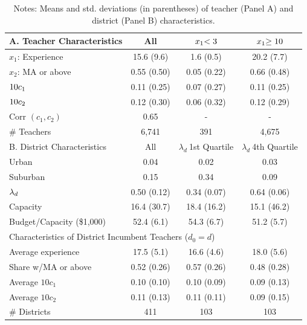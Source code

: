 \documentclass[notitlepage,12pt]{article}%
\begin{document}
\begin{table}[bh]
\caption{Teacher and District Characteristics (2010)}
\begin{center}%
\begin{tabular}
[c]{lccc}\hline\hline
{\small A. Teacher Characteristics} & {\small All} & ${\small x}%
_{1}{\small <3}$ & ${\small x}_{1}{\small \geq10}$\\\hline
$x_{1}$: {\small Experience} & {\small 15.6 (9.6)} & {\small 1.6 (0.5)} &
{\small 20.2 (7.7)}\\
$x_{2}$: {\small MA or above} & {\small 0.55 (0.50)} & {\small 0.05 (0.22)} &
{\small 0.66 (0.48)}\\
${\small 10c}_{1}$ & {\small 0.11 (0.25)} & {\small 0.07 (0.27)} &
{\small 0.11 (0.25)}\\
${\small 10c}_{2}$ & {\small 0.12 (0.30)} & {\small 0.06 (0.32)} &
{\small 0.12 (0.29)}\\
{\small Corr $\left(  c_{1},c_{2}\right)  $} & {\small 0.65} & {\small -} &
{\small -}\\
{\small \# Teachers} & {\small 6,741} & {\small 391} & {\small 4,675}\\\hline
{\small B. District Characteristics} & {\small All} & $\lambda_{d}%
\ ${\small 1st Quartile} & $\lambda_{d}\ ${\small 4th Quartile}\\\hline
{\small Urban} & {\small 0.04} & {\small 0.02} & {\small 0.03}\\
{\small Suburban} & {\small 0.15} & {\small 0.34} & {\small 0.09}\\
${\small \lambda}_{d}$ & {\small 0.50 (0.12)} & {\small 0.34 (0.07)} &
{\small 0.64 (0.06)}\\
{\small Capacity} & {\small 16.4 (30.7)} & {\small 18.4 (16.2)} & {\small 15.1
(46.2)}\\
{\small Budget/Capacity} {\small (\$1,000)} & {\small 52.4 (6.1)} &
{\small 54.3 (6.7)} & {\small 51.2 (5.7)}\\
\multicolumn{4}{l}{{\small Characteristics of District Incumbent Teachers
(}$d_{0}=d${\small )}}\\
{\small Average experience} & {\small 17.5 (5.1)} & {\small 16.6 (4.6)} &
{\small 18.0 (5.6)}\\
{\small Share w/MA or above} & {\small 0.52 (0.26)} & {\small 0.57 (0.26)} &
{\small 0.48 (0.28)}\\
{\small Average }$10c_{1}$ & {\small 0.10 (0.10)} & {\small 0.10 (0.09)} &
{\small 0.09 (0.13)}\\
{\small Average }$10c_{2}$ & {\small 0.11 (0.13)} & {\small 0.11 (0.11)} &
{\small 0.09 (0.15)}\\
{\small \# Districts} & {\small 411} & {\small 103} & {\small 103}%
\\\hline\hline
\end{tabular}
\end{center}
\par
\caption*{{\footnotesize Notes: Means and std. deviations (in parentheses)
of teacher (Panel A) and district (Panel B) characteristics.}}\end{table}
\end{document}
